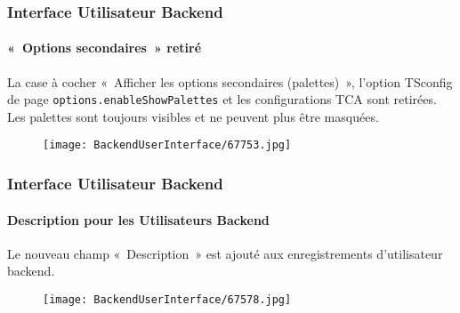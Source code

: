 \begin{frame}[fragile]
	\frametitle{Interface Utilisateur Backend}
	\framesubtitle{«~Options secondaires~» retiré}

	La case à cocher «~Afficher les options secondaires (palettes)~», l'option TSconfig de page
	\texttt{options.enableShowPalettes} et les configurations TCA sont retirées. Les palettes sont
	toujours visibles et ne peuvent plus être masquées.

	\begin{figure}
		\texttt{[image: BackendUserInterface/67753.jpg]}
	\end{figure}

\end{frame}

\begin{frame}[fragile]
	\frametitle{Interface Utilisateur Backend}
	\framesubtitle{Description pour les Utilisateurs Backend}

	Le nouveau champ «~Description~» est ajouté aux enregistrements d'utilisateur backend.

	\begin{figure}
		\texttt{[image: BackendUserInterface/67578.jpg]}
	\end{figure}

\end{frame}

